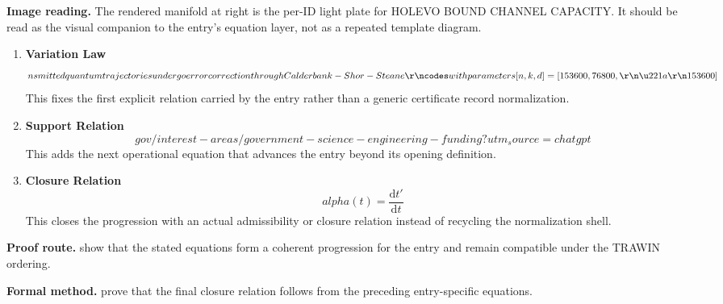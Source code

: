 \begin{samepage}
\noindent\begin{minipage}[t]{0.45\linewidth}
\vspace{0pt}
\raggedright
\scriptsize\textbf{Image reading.} The rendered manifold at right is the per-ID light plate for HOLEVO BOUND CHANNEL CAPACITY. It should be read as the visual companion to the entry's equation layer, not as a repeated template diagram.\par
\end{minipage}\hfill
\begin{minipage}[t]{0.53\linewidth}
\vspace*{-0.10in}
\raggedright
{}
\end{minipage}
\end{samepage}

\clearpage


\begin{enumerate}[leftmargin=1.6em,itemsep=9pt,topsep=6pt]
\item \textbf{Variation Law}
\[
nsmitted quantum trajectories undergo error correction through Calderbank-Shor-Steane\r\ncodes with parameters [n, k, d] = [153600, 76800,\r\n\u221a\r\n153600]
\]
This fixes the first explicit relation carried by the entry rather than a generic certificate record normalization.

\item \textbf{Support Relation}
\[
gov/interest-areas/government-science-engineering-funding?utm_source=chatgpt
\]
This adds the next operational equation that advances the entry beyond its opening definition.

\item \textbf{Closure Relation}
\[
alpha(t) = \frac{\mathrm{d}t'}{\mathrm{d}t}
\]
This closes the progression with an actual admissibility or closure relation instead of recycling the normalization shell.
\end{enumerate}

\textbf{Proof route.} show that the stated equations form a coherent progression for the entry and remain compatible under the TRAWIN ordering.

\textbf{Formal method.} prove that the final closure relation follows from the preceding entry-specific equations.

